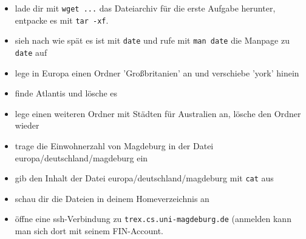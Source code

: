 \begin{itemize}
\item lade dir mit \lstinline$wget ...$ das Dateiarchiv für die erste Aufgabe herunter, entpacke es mit \lstinline$tar -xf$.
\item sieh nach wie spät es ist mit \lstinline$date$ und rufe mit \lstinline$man date$ die Manpage zu \lstinline$date$ auf
\item lege in Europa einen Ordner 'Großbritanien' an und verschiebe 'york' hinein
\item finde Atlantis und lösche es
\item lege einen weiteren Ordner mit Städten für Australien an, lösche den Ordner wieder
\item trage die Einwohnerzahl von Magdeburg in der Datei europa/deutschland/magdeburg ein
\item gib den Inhalt der Datei europa/deutschland/magdeburg mit \lstinline$cat$ aus
\item schau dir die Dateien in deinem Homeverzeichnis an
\item öffne eine ssh-Verbindung zu \lstinline$trex.cs.uni-magdeburg.de$ (anmelden kann man sich dort mit seinem FIN-Account.
\end{itemize}

